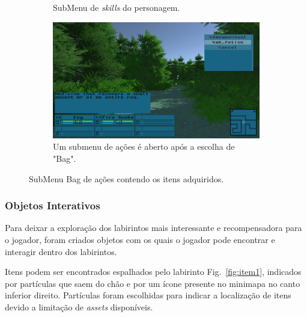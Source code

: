 \documentclass[
	12pt,				%
	openright,			%
	twoside,			%
	a4paper,			%
	english,			%
	french,				%
	spanish,			%
	brazil				%
	]{abntex2}
\begin{document}
\begin{figure}[h!]
\begin{subfigure}[b]{0.45\linewidth}
    \caption{SubMenu de \emph{skills} do personagem.}
  \end{subfigure}
  \begin{subfigure}[b]{0.45\linewidth}
    \includegraphics[width=\linewidth]{bag.jpg}
    \caption{Um submenu de ações é aberto após a escolha de "Bag".}
  \end{subfigure}
  \caption{SubMenu Bag de ações contendo os itens adquiridos.}
  \label{fig:menu2}
\end{figure}
\pagebreak
\subsubsection{Objetos Interativos}\label{chap:interactables}

Para deixar a exploração dos labirintos mais interessante e recompensadora para o jogador, foram criados objetos com os quais o jogador pode encontrar e interagir dentro dos labirintos.

	Itens podem ser encontrados espalhados pelo labirinto Fig.~\ref{fig:item1}, indicados por partículas que saem do chão e por um ícone presente no minimapa no canto inferior direito. Partículas foram escolhidas para indicar a localização de itens devido a limitação de \emph{assets} disponíveis.
	
\end{document}
